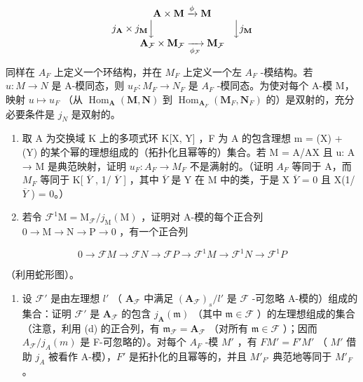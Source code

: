 \[
\begin{array}{c} \mathbf {A} \times \mathbf {M} \xrightarrow {\phi} \mathbf {M} \\ j _ {\mathbf {A}} \times j _ {\mathbf {M}} \Big \downarrow \qquad \qquad \qquad \qquad \Big \downarrow j _ {\mathbf {M}} \\ \mathbf {A} _ {\mathcal {F}} \times \mathbf {M} _ {\mathcal {F}} \xrightarrow [ \phi_ {\mathcal {F}} ]{} \mathbf {M} _ {\mathcal {F}} \end{array}
\]

同样在 \(A_{F}\) 上定义一个环结构，并在 \(M_{F}\) 上定义一个左 \(A_{F}\) -模结构。若 \(u: M \to N\) 是 A-模同态，则 \(u_{F}: M_{F} \to N_{F}\) 是 \(A_{F}\) -模同态。为使对每个 A-模 M，映射 \(u \mapsto u_{F}\) （从 \(\operatorname{Hom}_{\mathbf{A}}(\mathbf{M}, \mathbf{N})\) 到 \(\operatorname{Hom}_{\mathbf{A}_{F}}(\mathbf{M}_{F}, \mathbf{N}_{F})\) 的）是双射的，充分必要条件是 \(j_{N}\) 是双射的。

\begin{enumerate}
\def\labelenumi{(\alph{enumi})}
\setcounter{enumi}{5}
\item
  取 A 为交换域 K 上的多项式环 K{[}X, Y{]} ，F 为 A 的包含理想 m = (X) + (Y) 的某个幂的理想组成的（拓扑化且幂等的）集合。若 M = A/AX 且 u: A → M 是典范映射，证明 \(u_{F}: A_{F} \to M_{F}\) 不是满射的。（证明 \(A_{F}\) 等同于 A，而 \(M_{F}\) 等同于 K{[} \(\overline{Y}\) , 1/ \(\overline{Y}\) {]} ，其中 \(\overline{Y}\) 是 Y 在 M 中的类，于是 X \(\overline{Y}\) = 0 且 X(1/ \(\overline{Y}\) ) = 0。）
\item
  若令 \(\mathcal{F}^1\mathrm{M} = \mathrm{M}_{\mathcal{F}} / j_{\mathrm{M}}(\mathrm{M})\) ，证明对 A-模的每个正合列 \(0\to \mathrm{M}\to \mathrm{N}\to \mathrm{P}\to 0\) ，有一个正合列
\end{enumerate}

\[
0 \rightarrow \mathcal {F} M \rightarrow \mathcal {F} N \rightarrow \mathcal {F} P \rightarrow \mathcal {F} ^ {1} M \rightarrow \mathcal {F} ^ {1} N \rightarrow \mathcal {F} ^ {1} P
\]

（利用蛇形图）。

\begin{enumerate}
\def\labelenumi{(\alph{enumi})}
\setcounter{enumi}{7}
\tightlist
\item
  设 \(\mathcal{F}'\) 是由左理想 \(l'\) （ \(\mathbf{A}_{\mathcal{F}}\) 中满足 \((\mathbf{A}_{\mathcal{F}})_s / l'\) 是 \(\mathcal{F}\) -可忽略 A-模的）组成的集合：证明 \(\mathcal{F}'\) 是 \(\mathbf{A}_{\mathcal{F}}\) 的包含 \(j_{\mathbf{A}}(\mathfrak{m})\) （其中 \(\mathfrak{m} \in \mathcal{F}\) ）的左理想组成的集合（注意，利用 (d) 的正合列，有 \(\mathfrak{m}_{\mathcal{F}} = \mathbf{A}_{\mathcal{F}}\) （对所有 \(\mathfrak{m} \in \mathcal{F}\) ）；因而 \(A_{\mathcal{F}}/j_{A}(m)\) 是 F-可忽略的）。对每个 \(A_{F}\) -模 \(M'\) ，有 \(FM' = F'M'\) （ \(M'\) 借助 \(j_{A}\) 被看作 A-模），\(F'\) 是拓扑化的且幂等的，并且 \(M'_{F'}\) 典范地等同于 \(M'_{F}\) 。
\end{enumerate}

